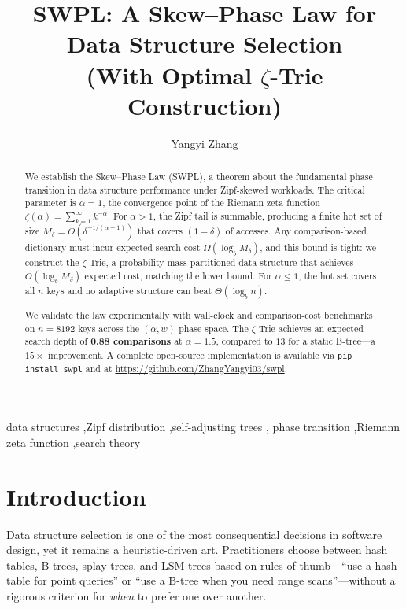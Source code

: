 \documentclass[preprint,12pt,authoryear]{elsarticle}
\newcommand{\Zeta}{\zeta}
\begin{document}
\begin{frontmatter}

\title{SWPL: A Skew--Phase Law for Data Structure Selection\\(With Optimal $\zeta$-Trie Construction)}

\author[gu]{Yangyi Zhang}
\address[gu]{Department of Computer Science, Georgetown University,
Washington, DC 20057, United States}

\begin{abstract}
We establish the Skew--Phase Law (SWPL), a theorem about the fundamental
phase transition in data structure performance under Zipf-skewed workloads.
The critical parameter is $\alpha = 1$, the convergence point of the
Riemann zeta function $\Zeta(\alpha) = \sum_{k=1}^\infty k^{-\alpha}$.
For $\alpha > 1$, the Zipf tail is summable, producing a finite hot set
of size $M_\delta = \Theta(\delta^{-1/(\alpha-1)})$ that covers
$(1-\delta)$ of accesses.  Any comparison-based dictionary must incur
expected search cost $\Omega(\log_b M_\delta)$, and this bound is tight:
we construct the $\zeta$-Trie, a probability-mass-partitioned data structure
that achieves $O(\log_b M_\delta)$ expected cost, matching the lower bound.
For $\alpha \leq 1$, the hot set covers all $n$ keys and no adaptive
structure can beat $\Theta(\log_b n)$.

We validate the law experimentally with wall-clock and comparison-cost
benchmarks on $n = 8192$ keys across the $(\alpha, w)$ phase space.
The $\zeta$-Trie achieves an expected search depth of {\bf 0.88 comparisons}
at $\alpha = 1.5$, compared to $13$ for a static B-tree---a $15\times$
improvement.  A complete open-source implementation is available via
\verb|pip install swpl| and at \url{https://github.com/ZhangYangyi03/swpl}.
\end{abstract}

\begin{keyword}
data structures \sep Zipf distribution \sep self-adjusting trees \sep
phase transition \sep Riemann zeta function \sep search theory
\end{keyword}

\end{frontmatter}

\section{Introduction}

Data structure selection is one of the most consequential decisions in
software design, yet it remains a heuristic-driven art.  Practitioners
choose between hash tables, B-trees, splay trees, and LSM-trees based
on rules of thumb---``use a hash table for point queries'' or ``use
a B-tree when you need range scans''---without a rigorous criterion
for \emph{when} to prefer one over another.
\end{document}
